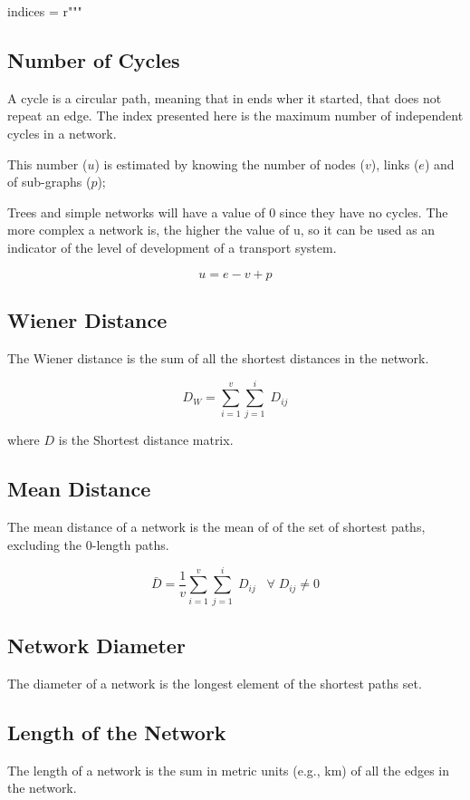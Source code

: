         indices = r"""
        \subsection{Number of Cycles}
	A cycle is a circular path, meaning that in ends wher it started, that does not repeat an edge. The index presented here is the maximum number of independent cycles in a network.
	
        This number ($u$) is estimated by knowing the number of nodes ($v$), 
        links ($e$) and of sub-graphs ($p$);
        
        Trees and simple networks will have a value of 0 since they have 
        no cycles. 
        The more complex a network is, the higher the value of u, 
        so it can be used as an indicator of the level of development 
        of a transport system.
        
        $$ u=e-v+p$$
        
        \subsection{Wiener Distance}
        The Wiener distance is the sum of all the shortest distances in the network.
        
        $$D_W =\sum_{i=1}^v\sum_{j=1}^i\;D_{ij}$$
	
	where $D$ is the Shortest distance matrix.
        
        \subsection{Mean Distance}
        The mean distance of a network is the mean of of the set of shortest paths, 
        excluding the 0-length paths.
        
        $$\bar{D}=\frac{1}{v}\sum_{i=1}^v\sum_{j=1}^i\;D_{ij}\;\;\; \forall\; D_{ij}\neq0$$ 
        \subsection{Network Diameter}
        The diameter of a network is the longest element of the shortest paths set.
        
        \subsection{Length of the Network}
        The length of a network is the sum in metric units (e.g., km) of all the edges in the network.

